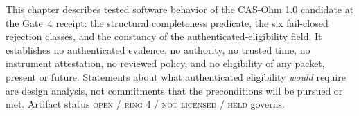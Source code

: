 \begin{boundary}\label{elig:bound:chapter}
This chapter describes tested software behavior of the CAS-Ohm 1.0 candidate at the Gate~4 receipt: the structural completeness predicate, the six fail-closed rejection classes, and the constancy of the authenticated-eligibility field. It establishes no authenticated evidence, no authority, no trusted time, no instrument attestation, no reviewed policy, and no eligibility of any packet, present or future. Statements about what authenticated eligibility \emph{would} require are design analysis, not commitments that the preconditions will be pursued or met. Artifact status \textsc{open / ring 4 / not licensed / held} governs.
\end{boundary}
